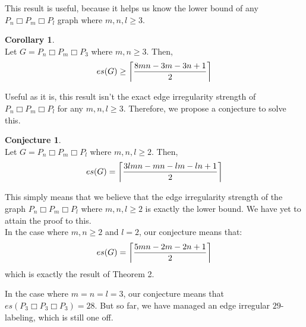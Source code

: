 \documentclass[12pt, a4paper]{report}
\newlength\tindent
\renewcommand{\indent}{\hspace*{\tindent}}
\DeclarePairedDelimiter{\ceil}{\lceil}{\rceil}
\theoremstyle{definition}
\theoremstyle{definition}
\theoremstyle{remark}
\theoremstyle{definition}
\newtheorem*{corollary*}{Corollary}
\theoremstyle{definition}
\newtheorem*{conjecture*}{Conjecture}
\begin{document}
This result is useful, because it helps us know the lower bound of any $P_n\Box P_m\Box P_l$ graph where $m,n,l\geq3$.

\begin{corollary*}
\ \\\indent Let $G=P_n\Box P_m\Box P_3$ where $m,n\geq3$. Then,
\begin{equation*}
	es(G)\geq \ceil[\bigg ]{\frac{8mn-3m-3n+1}{2}}
\end{equation*}
\end{corollary*}

Useful as it is, this result isn't the exact edge irregularity strength of $P_n\Box P_m\Box P_l$ for any $m,n,l\geq3$. Therefore, we propose a conjecture to solve this.

\begin{conjecture*}
\ \\\indent Let $G=P_n\Box P_m\Box P_l$ where $m,n,l\geq 2$. Then,
\begin{equation*}
es(G) = \ceil[\bigg ]{\frac{3lmn-mn-lm-ln+1}{2}}
\end{equation*}
\end{conjecture*}

This simply means that we believe that the edge irregularity strength of the graph $P_n\Box P_m\Box P_l$ where $m,n,l\geq2$ is exactly the lower bound. We have yet to attain the proof to this.\\

In the case where $m,n\geq2$ and $l=2$, our conjecture means that:
\begin{equation*}
	es(G) = \ceil[\bigg ]{\frac{5mn-2m-2n+1}{2}}
\end{equation*}
which is exactly the result of Theorem 2.\\

\newpage

In the case where $m=n=l=3$, our conjecture means that $es(P_3\Box P_3\Box P_3) = 28$. But so far, we have managed an edge irregular $29$-labeling, which is still one off.
\end{document}
